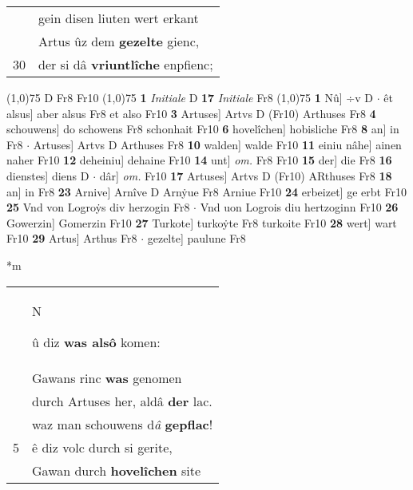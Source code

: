 \documentclass[8pt,a4paper,notitlepage]{article}
\begin{document}
\begin{table}[ht]
\begin{minipage}[t]{0.5\linewidth}
\begin{tabular}{rl}
 & gein disen liuten wert erkant\\ 
 & Artus ûz dem \textbf{gezelte} gienc,\\ 
30 & der si dâ \textbf{vriuntlîche} enpfienc;\\ 
\end{tabular}
\scriptsize
\line(1,0){75} \newline
D Fr8 Fr10 \newline
\line(1,0){75} \newline
\textbf{1} \textit{Initiale} D  \textbf{17} \textit{Initiale} Fr8  \newline
\line(1,0){75} \newline
\textbf{1} Nû] ÷v D  $\cdot$ êt alsus] aber alsus Fr8 et also Fr10 \textbf{3} Artuses] Artvs D (Fr10) Arthuses Fr8 \textbf{4} schouwens] do schowens Fr8 schonhait Fr10 \textbf{6} hovelîchen] hobisliche Fr8 \textbf{8} an] in Fr8  $\cdot$ Artuses] Artvs D Arthuses Fr8 \textbf{10} walden] walde Fr10 \textbf{11} einiu nâhe] ainen naher Fr10 \textbf{12} deheiniu] dehaine Fr10 \textbf{14} unt] \textit{om.} Fr8 Fr10 \textbf{15} der] die Fr8 \textbf{16} dienstes] diens D  $\cdot$ dâr] \textit{om.} Fr10 \textbf{17} Artuses] Artvs D (Fr10) ARthuses Fr8 \textbf{18} an] in Fr8 \textbf{23} Arnive] Arnîve D Arnẏue Fr8 Arniue Fr10 \textbf{24} erbeizet] ge erbt Fr10 \textbf{25} Vnd von Logroẏs div herzogin Fr8  $\cdot$ Vnd uon Logrois diu hertzoginn Fr10 \textbf{26} Gowerzin] Gomerzin Fr10 \textbf{27} Turkote] turkoẏte Fr8 turkoite Fr10 \textbf{28} wert] wart Fr10 \textbf{29} Artus] Arthus Fr8  $\cdot$ gezelte] paulune Fr8 \newline
\end{minipage}
\hspace{0.5cm}
\begin{minipage}[t]{0.5\linewidth}
\small
\begin{center}*m
\end{center}
\begin{tabular}{rl}
 & \begin{large}N\end{large}û diz \textbf{was alsô} komen:\\ 
 & Gawans rinc \textbf{was} genomen\\ 
 & durch Artuses her, aldâ \textbf{der} lac.\\ 
 & waz man schouwens d\textit{â} \textbf{gepflac}!\\ 
5 & ê diz volc durch si gerite,\\ 
 & Gawan durch \textbf{hovelîchen} site\\ 

\end{tabular}
\end{minipage}
\end{table}
\end{document}
